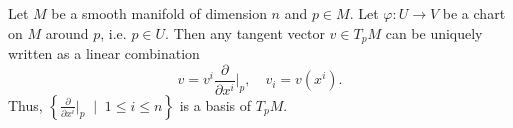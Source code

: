\begin{proposition}\label{prop:basis_TpM}
	Let $M$ be a smooth manifold of dimension $n$ and $p\in M$.
	Let $\varphi: U \to V$ be a chart on $M$ around $p$, i.e. $p\in U$.
	Then any tangent vector $v\in T_p M$ can be uniquely written as a linear combination
	\begin{equation}
		v = v^i \frac{\partial}{\partial x^i}\Big|_p, \quad v_i = v(x^i).
	\end{equation}
	Thus, $\left\{\frac{\partial}{\partial x^i}\Big|_p\;\mid\; 1\leq i\leq n\right\}$ is a basis of $T_p M$.
\end{proposition}

